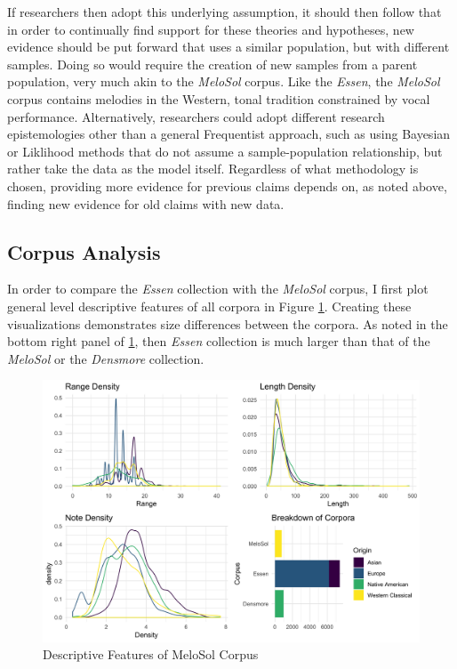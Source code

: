\documentclass[12pt,]{book}
\begin{document}
If researchers then adopt this underlying assumption, it should then follow that in order to continually find support for these theories and hypotheses, new evidence should be put forward that uses a similar population, but with different samples.
Doing so would require the creation of new samples from a parent population, very much akin to the \emph{MeloSol} corpus.
Like the \emph{Essen}, the \emph{MeloSol} corpus contains melodies in the Western, tonal tradition constrained by vocal performance.
Alternatively, researchers could adopt different research epistemologies other than a general Frequentist approach, such as using Bayesian or Liklihood methods that do not assume a sample-population relationship, but rather take the data as the model itself.
Regardless of what methodology is chosen, providing more evidence for previous claims depends on, as noted above, finding new evidence for old claims with new data.

\hypertarget{corpus-analysis-1}{%
\subsection{Corpus Analysis}\label{corpus-analysis-1}}

In order to compare the \emph{Essen} collection with the \emph{MeloSol} corpus, I first plot general level descriptive features of all corpora in Figure \ref{fig:compdesc}.
Creating these visualizations demonstrates size differences between the corpora.
As noted in the bottom right panel of \ref{fig:compdesc}, then \emph{Essen} collection is much larger than that of the \emph{MeloSol} or the \emph{Densmore} collection.

\begin{figure}

{\centering \includegraphics[width=1\linewidth]{img/comparative_descritivepanel} 

}

\caption{Descriptive Features of MeloSol Corpus}\label{fig:compdesc}
\end{figure}
\end{document}

